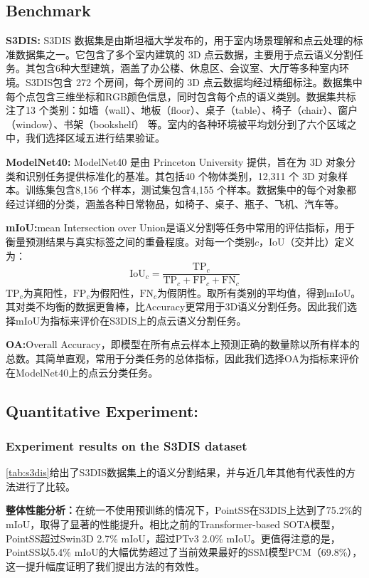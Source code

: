 \documentclass[preprint,12pt]{elsarticle}
\begin{document}
\subsection{Benchmark}
\textbf{S3DIS:}
S3DIS 数据集是由斯坦福大学发布的，用于室内场景理解和点云处理的标准数据集之一。它包含了多个室内建筑的 3D 点云数据，主要用于点云语义分割任务。其包含6种大型建筑，涵盖了办公楼、休息区、会议室、大厅等多种室内环境。S3DIS包含 272 个房间，每个房间的 3D 点云数据均经过精细标注。数据集中每个点包含三维坐标和RGB颜色信息，同时包含每个点的语义类别。数据集共标注了13 个类别：如墙（wall）、地板（floor）、桌子（table）、椅子（chair）、窗户（window）、书架（bookshelf） 等。室内的各种环境被平均划分到了六个区域之中，我们选择区域五进行结果验证。


\textbf{ModelNet40:}
ModelNet40 是由 Princeton University 提供，旨在为 3D 对象分类和识别任务提供标准化的基准。其包括40 个物体类别，12,311 个 3D 对象样本。训练集包含8,156 个样本，测试集包含4,155 个样本。数据集中的每个对象都经过详细的分类，涵盖各种日常物品，如椅子、桌子、瓶子、飞机、汽车等。


\textbf{mIoU:}mean Intersection over Union是语义分割等任务中常用的评估指标，用于衡量预测结果与真实标签之间的重叠程度。对每一个类别$c$，IoU（交并比）定义为：\begin{equation}\mathrm{IoU}_c=\frac{\mathrm{TP}_c}{\mathrm{TP}_c+\mathrm{FP}_c+\mathrm{FN}_c}\end{equation}
$\mathrm{TP}_{c}$为真阳性，$\mathrm{FP}_{c}$为假阳性，$\mathrm{FN}_{c}$为假阴性。取所有类别的平均值，得到mIoU。其对类不均衡的数据更鲁棒，比Accuracy更常用于3D语义分割任务。因此我们选择mIoU为指标来评价在S3DIS上的点云语义分割任务。

\textbf{OA:}Overall Accuracy，即模型在所有点云样本上预测正确的数量除以所有样本的总数。其简单直观，常用于分类任务的总体指标，因此我们选择OA为指标来评价在ModelNet40上的点云分类任务。

\subsection{Quantitative Experiment:}
\subsubsection{Experiment results on the S3DIS dataset}
\cref{tab:s3dis}给出了S3DIS数据集上的语义分割结果，并与近几年其他有代表性的方法进行了比较。

\textbf{整体性能分析：}在统一不使用预训练的情况下，PointSS在S3DIS上达到了75.2\%的mIoU，取得了显著的性能提升。相比之前的Transformer-based SOTA模型，PointSS超过Swin3D 2.7\% mIoU，超过PTv3 2.0\% mIoU。更值得注意的是，PointSS以5.4\% mIoU的大幅优势超过了当前效果最好的SSM模型PCM（69.8\%），这一提升幅度证明了我们提出方法的有效性。
\end{document}
